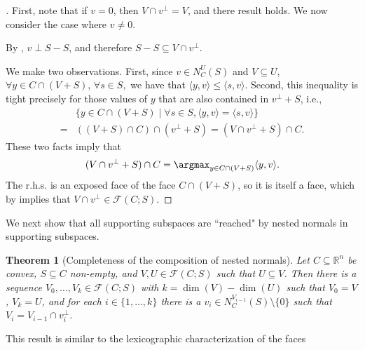 \documentclass{article}
\theoremstyle{plain}
\newtheorem{theorem}{Theorem}[section]
\theoremstyle{definition}
\theoremstyle{remark}
\begin{document}
\begin{proof}[\hypertarget{loc:nested_normals_induce_supporting_subspaces.proof}Proof of \Cref{loc:nested_normals_induce_supporting_subspaces.statement}]

First, note that if $v=0$, then $V \cap v^\perp=V$, and there result holds. We now consider the case where $v \neq 0$.

By , $v \perp S-S$, and therefore 
$S-S \subseteq V \cap v^\perp$. 

We make two observations. 
First, since $v \in N_C^U(S)$ and $V \subseteq U$, $\forall y \in C \cap (V+S)$, $\forall s \in S,$ we have that $\langle y, v\rangle \le \langle s, v\rangle$. Second,
this inequality is tight precisely for those values of $y$ that are also contained in $v^\perp + S$, i.e.,
\begin{align*}
&\{y \in C \cap (V+S) \mid \forall s \in S, \langle y, v\rangle = \langle s, v\rangle\}\\
=&((V +S) \cap C) \cap (v^\perp + S) = (V \cap v^\perp + S) \cap C.
\end{align*}
These two facts imply that 
\begin{equation*}
(V \cap v^\perp + S) \cap C = \argmax_{y \in C \cap (V+S)} \langle y, v\rangle.
\end{equation*}
The r.h.s. is an exposed face of the face $C \cap (V+S)$, so it is itself a
face, which by
implies that $V \cap v^\perp  \in \mathcal{F}(C;S)$.
\end{proof}
We next show that all supporting subspaces are ``reached" by nested normals
in supporting subspaces.
\begin{theorem}[Completeness of the composition of nested normals]
\label{loc:completeness_of_the_composition_of_nested_normals.statement}
Let $C \subseteq \mathbb{R}^n$ be convex, $S \subseteq C$ non-empty,
and $V, U \in \mathcal{F}(C;S)$ such that $U \subseteq V$.
Then there is a sequence $V_0, \ldots, V_k \in \mathcal{F}(C;S)$ 
with $k= \dim(V)-\dim(U)$ such that $V_0=V$, $V_k=U$, and for each
$i \in \{ 1, \ldots,k\}$ there is a $v_i \in N_C^{V_{i-1}}(S) \setminus \{0\}$ such that $V_i = V_{i-1} \cap v_i^\perp$.
\end{theorem}
This result is similar to the lexicographic characterization of the faces
\end{document}
